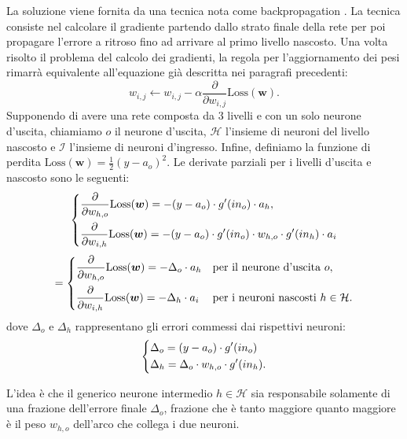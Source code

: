 \documentclass[../../main.tex]{subfiles}
\begin{document}
La soluzione viene fornita da una tecnica nota come backpropagation \cite{Rumelhart1986LearningRB}. La tecnica consiste nel calcolare il gradiente partendo dallo strato finale della rete per poi propagare l'errore a ritroso fino ad arrivare al primo livello nascosto. Una volta risolto il problema del calcolo dei gradienti, la regola per l'aggiornamento dei pesi rimarrà equivalente all'equazione già descritta nei paragrafi precedenti:
\begin{equation}
    w_{i,j} \leftarrow w_{i,j} - \alpha \frac{\partial}{\partial w_{i,j}}\mathrm{Loss}(\boldsymbol{w}).
    \label{eqn:mlpgradientdesc}
\end{equation}
Supponendo di avere una rete composta da 3 livelli e con un solo neurone d'uscita, chiamiamo $o$ il neurone d'uscita, $\mathcal{H}$ l'insieme di neuroni del livello nascosto e $\mathcal{I}$ l'insieme di neuroni d'ingresso. Infine, definiamo la funzione di perdita $\mathrm{Loss}(\boldsymbol{w}) = \frac{1}{2} (y - a_o)^2$. Le derivate parziali per i livelli d'uscita e nascosto sono le seguenti:
\begin{equation*}
    \begin{dcases}
        \frac{\partial}{\partial w_{h,o}} \mathrm{Loss}(\boldsymbol{w}) = - (y - a_{o}) \cdot g'(in_o) \cdot a_h,\\
        \frac{\partial}{\partial w_{i,h}} \mathrm{Loss}(\boldsymbol{w}) =  - (y - a_{o}) \cdot g'(in_o) \cdot w_{h,o} \cdot g'(in_h) \cdot a_i
    \end{dcases}
\end{equation*}
\begin{equation}
    =
    \begin{dcases}
        \frac{\partial}{\partial w_{h,o}} \mathrm{Loss}(\boldsymbol{w}) = - \Delta_o \cdot a_h & \text{per il neurone d'uscita } o,\\
        \frac{\partial}{\partial w_{i,h}} \mathrm{Loss}(\boldsymbol{w}) = - \Delta_h \cdot a_i& \text{per i neuroni nascosti } h \in \mathcal{H}.
    \end{dcases}   
    \label{eqn:backpropgradient}
\end{equation}
dove $\Delta_o$ e $\Delta_h$ rappresentano gli errori commessi dai rispettivi neuroni:
\[
\begin{dcases}
    \Delta_o = (y - a_{o}) \cdot g'(in_o)\\
    \Delta_h = \Delta_o \cdot w_{h,o} \cdot g'(in_h) .
\end{dcases}    
\]

L'idea è che il generico neurone intermedio $h \in \mathcal{H}$ sia responsabile solamente di una frazione dell'errore finale $\Delta_o$, frazione che è tanto maggiore quanto maggiore è il peso $w_{h,o}$ dell'arco che collega i due neuroni.
\end{document}
